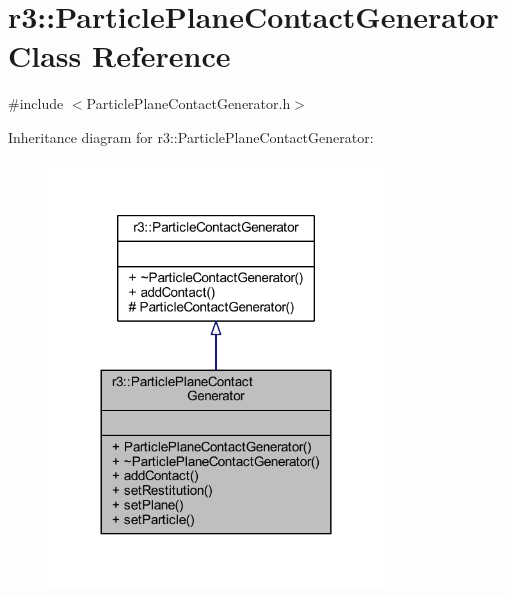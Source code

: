 \hypertarget{classr3_1_1_particle_plane_contact_generator}{}\section{r3\+:\+:Particle\+Plane\+Contact\+Generator Class Reference}
\label{classr3_1_1_particle_plane_contact_generator}


{\ttfamily \#include $<$Particle\+Plane\+Contact\+Generator.\+h$>$}



Inheritance diagram for r3\+:\+:Particle\+Plane\+Contact\+Generator\+:\nopagebreak
\begin{figure}[H]
\begin{center}
\leavevmode
\includegraphics[width=252pt]{classr3_1_1_particle_plane_contact_generator__inherit__graph}
\end{center}
\end{figure}


